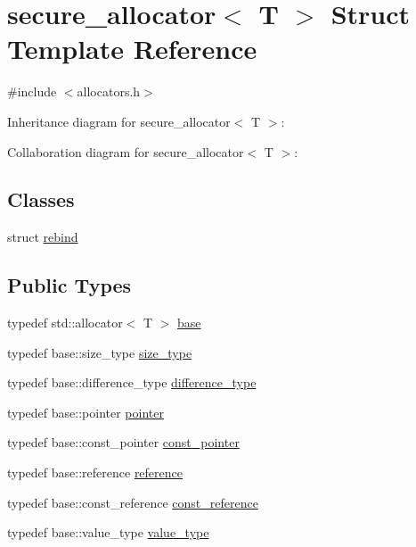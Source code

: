 \hypertarget{structsecure__allocator}{}\section{secure\+\_\+allocator$<$ T $>$ Struct Template Reference}
\label{structsecure__allocator}


{\ttfamily \#include $<$allocators.\+h$>$}



Inheritance diagram for secure\+\_\+allocator$<$ T $>$\+:


Collaboration diagram for secure\+\_\+allocator$<$ T $>$\+:
\subsection*{Classes}
\begin{DoxyCompactItemize}
\item 
struct \hyperlink{structsecure__allocator_1_1rebind}{rebind}
\end{DoxyCompactItemize}
\subsection*{Public Types}
\begin{DoxyCompactItemize}
\item 
typedef std\+::allocator$<$ T $>$ \hyperlink{structsecure__allocator_aecbe486abe3e32e35e3289e149bd2356}{base}
\item 
typedef base\+::size\+\_\+type \hyperlink{structsecure__allocator_aa9db67804b069d61983213bded98c08f}{size\+\_\+type}
\item 
typedef base\+::difference\+\_\+type \hyperlink{structsecure__allocator_a6ced0c166194ce9a266df10018cbb862}{difference\+\_\+type}
\item 
typedef base\+::pointer \hyperlink{structsecure__allocator_a71b267e8d1667eacf8c3505cce785aea}{pointer}
\item 
typedef base\+::const\+\_\+pointer \hyperlink{structsecure__allocator_abf76dd1c45de47c15d7a8c53cb2d8ab9}{const\+\_\+pointer}
\item 
typedef base\+::reference \hyperlink{structsecure__allocator_a6d85bb5fed183fb2304b8403a8843eb4}{reference}
\item 
typedef base\+::const\+\_\+reference \hyperlink{structsecure__allocator_a5ec58945b7a8010f7e8a77ebfd96ae8e}{const\+\_\+reference}
\item 
typedef base\+::value\+\_\+type \hyperlink{structsecure__allocator_a344198c1316ccf0a1b58ce9c0de7c012}{value\+\_\+type}
\end{DoxyCompactItemize}
